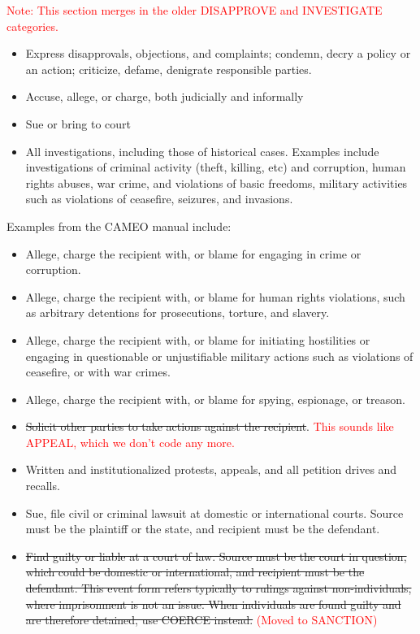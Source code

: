 \documentclass[11pt]{report}
\newcommand{\plcat}[1]{\textsf{#1}}
\newcommand{\andy}[1]{\textcolor{red}{#1}}
\begin{document}
\andy{Note: This section merges in the older DISAPPROVE and INVESTIGATE categories.}

\begin{itemize}
	\item Express disapprovals, objections, and complaints; condemn, decry a policy or an action; criticize, defame, denigrate responsible parties.
	\item Accuse, allege, or charge, both judicially and informally
	\item Sue or bring to court
	\item All investigations, including those of historical cases. Examples include investigations of  criminal activity (theft, killing, etc) and corruption, human rights abuses, war crime, and violations of basic freedoms, military activities such as violations of ceasefire, seizures, and invasions.
\end{itemize}

Examples from the CAMEO manual include:

\begin{itemize}
\item  Allege, charge the recipient with, or blame for engaging in crime or corruption.
\item Allege, charge the recipient with, or blame for human rights violations, such as arbitrary detentions for prosecutions, torture, and slavery.
\item Allege, charge the recipient with, or blame for initiating hostilities or engaging in questionable or unjustifiable military actions such as violations of ceasefire, or with war crimes.
\item Allege, charge the recipient with, or blame for spying, espionage, or treason.
\item \sout{Solicit other parties to take actions against the recipient}. \andy{This sounds like APPEAL, which we don't code any more.}
\item Written and institutionalized protests, appeals, and all petition drives and recalls. %
\item Sue, file civil or criminal lawsuit at domestic or international courts. Source must be the plaintiff or the state, and recipient must be the defendant.
\item \sout{Find guilty or liable at a court of law. Source must be the court in question, which could be domestic or international, and recipient must be the defendant. This event form refers typically to rulings against non-individuals, where imprisonment is not an issue. When individuals are found guilty and are therefore detained, use \plcat{COERCE} instead.} \andy{(Moved to SANCTION)}

\end{itemize}
\end{document}
